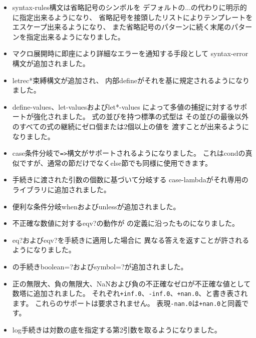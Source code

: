 \begin{itemize}
\item {\cf syntax-rules}構文は省略記号のシンボルを
デフォルトの{\cf ...}の代わりに明示的に指定出来るようになり、
省略記号を接頭したリストによりテンプレートをエスケープ出来るようになり、
また省略記号のパターンに続く末尾のパターンを指定出来るようになりました。

\item マクロ展開時に即座により詳細なエラーを通知する手段として
{\cf syntax-error}構文が追加されました。

\item {\cf letrec*}束縛構文が追加され、
内部{\cf define}がそれを基に規定されるようになりました。

\item {\cf define-values}、{\cf let-values}および{\cf let*-values}
によって多値の捕捉に対するサポートが強化されました。
式の並びを持つ標準の式型は
その並びの最後以外のすべての式の継続にゼロ個または2個以上の値を
渡すことが出来るようになりました。

\item {\cf case}条件分岐で{\tt =>}構文がサポートされるようになりました。
これは{\cf cond}の真似ですが、通常の節だけでなく{\cf else}節でも同様に使用できます。

\item 手続きに渡された引数の個数に基づいて分岐する
{\cf case-lambda}がそれ専用のライブラリに追加されました。

\item 便利な条件分岐{\cf when}および{\cf unless}が追加されました。

\item 不正確な数値に対する{\cf eqv?}の動作が
\rsixrs の定義に沿ったものになりました。

\item {\cf eq?}および{\cf eqv?}を手続きに適用した場合に
異なる答えを返すことが許されるようになりました。

\item \rsixrs の手続き{\cf boolean=?}および{\cf symbol=?}が追加されました。

\item 正の無限大、負の無限大、NaNおよび負の不正確なゼロが不正確な値として数塔に追加されました。
それぞれ{\tt +inf.0}、{\tt -inf.0}、{\tt +nan.0}、{}と書き表されます。
これらのサポートは要求されません。
表現{\tt -nan.0}は{\tt +nan.0}と同義です。

\item {\cf log}手続きは対数の底を指定する第2引数を取るようになりました。


\end{itemize}
